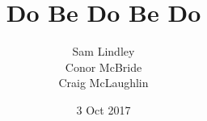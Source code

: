 \documentclass[12pt]{article}
\date{3 Oct 2017}
\begin{document}



\title{Do Be Do Be Do}


\author{Sam Lindley \\ Conor McBride \\ Craig McLaughlin}

\maketitle


\end{document}
